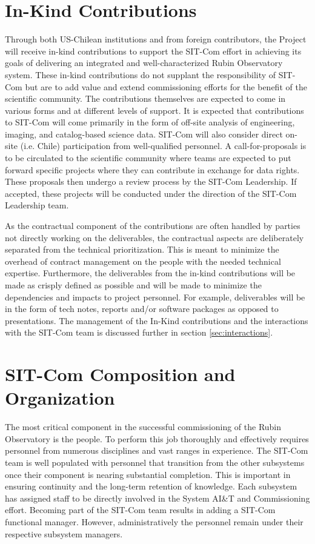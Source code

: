 \documentclass[SE,lsstdraft,authoryear,toc]{lsstdoc}
\begin{document}
\section{In-Kind Contributions}
\label{sec:in_kind}

Through both US-Chilean institutions and from foreign contributors, the Project will receive in-kind contributions to support the SIT-Com effort in achieving its goals of delivering an integrated and well-characterized Rubin Observatory system.
These in-kind contributions do not supplant the responsibility of SIT-Com but are to add value and extend commissioning efforts for the benefit of the scientific community.
The contributions themselves are expected to come in various forms and at different levels of support.
It is expected that contributions to SIT-Com will come primarily in the form of off-site analysis of engineering, imaging, and catalog-based science data.
SIT-Com will also consider direct on-site (i.e. Chile) participation from well-qualified personnel.
A call-for-proposals is to be circulated to the scientific community where teams are expected to put forward specific projects where they can contribute in exchange for data rights. These proposals then undergo a review process by the SIT-Com Leadership. If accepted, these projects will be conducted under the direction of the SIT-Com Leadership team.

As the contractual component of the contributions are often handled by parties not directly working on the deliverables, the contractual aspects are deliberately separated from the technical prioritization.
This is meant to minimize the overhead of contract management on the people with the needed technical expertise.
Furthermore, the deliverables from the in-kind contributions will be made as crisply defined as possible and will be made to minimize the dependencies and impacts to project personnel.
For example, deliverables will be in the form of tech notes, reports and/or software packages as opposed to presentations.
The management of the In-Kind contributions and the interactions with the SIT-Com team is discussed further in section \ref{sec:interactions}.

\section{SIT-Com Composition and Organization}
The most critical component in the successful commissioning of the Rubin Observatory is the people.
To perform this job thoroughly and effectively requires personnel from numerous disciplines and vast ranges in experience.
The SIT-Com team is well populated with personnel that transition from the other subsystems once their component is nearing substantial completion.
This is important in ensuring continuity and the long-term retention of knowledge.
Each subsystem has assigned staff to be directly involved in the System AI\&T and Commissioning effort.
Becoming part of the SIT-Com team results in adding a SIT-Com functional manager. However, administratively the personnel remain under their respective subsystem managers.
\end{document}
